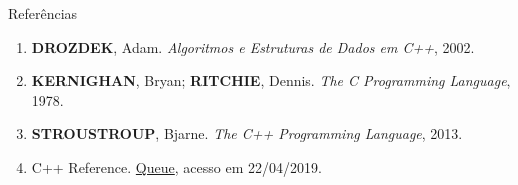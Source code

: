 \begin{frame}[fragile]{Referências}

    \begin{enumerate}
        \item \textbf{DROZDEK}, Adam. \textit{Algoritmos e Estruturas de Dados em C++}, 2002.

        \item \textbf{KERNIGHAN}, Bryan; \textbf{RITCHIE}, Dennis. \textit{The C Programming Language}, 1978.

        \item \textbf{STROUSTROUP}, Bjarne. \textit{The C++ Programming Language}, 2013.

		\item C++ Reference. \href{https://en.cppreference.com/w/cpp/container/queue}{Queue},
            acesso em 22/04/2019.
    \end{enumerate}

\end{frame}
